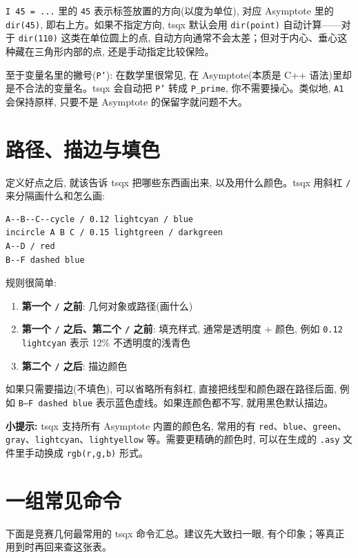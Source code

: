 \documentclass[11pt,oneside]{ctexbook}
\begin{document}
\texttt{I 45 = ...} 里的 \texttt{45} 表示标签放置的方向(以度为单位), 对应 Asymptote 里的 \texttt{dir(45)}, 即右上方。如果不指定方向, tsqx 默认会用 \texttt{dir(point)} 自动计算——对于 \texttt{dir(110)} 这类在单位圆上的点, 自动方向通常不会太差；但对于内心、垂心这种藏在三角形内部的点, 还是手动指定比较保险。

至于变量名里的撇号(\texttt{P'}): 在数学里很常见, 在 Asymptote(本质是 C++ 语法)里却是不合法的变量名。tsqx 会自动把 \texttt{P'} 转成 \texttt{P\_prime}, 你不需要操心。类似地, \texttt{A1} 会保持原样, 只要不是 Asymptote 的保留字就问题不大。

\section{路径、描边与填色}
定义好点之后, 就该告诉 tsqx 把哪些东西画出来, 以及用什么颜色。tsqx 用斜杠 \texttt{/} 来分隔画什么和怎么画:
\begin{lstlisting}[language={}]
A--B--C--cycle / 0.12 lightcyan / blue
incircle A B C / 0.15 lightgreen / darkgreen
A--D / red
B--F dashed blue
\end{lstlisting}

规则很简单:
\begin{enumerate}
	\item \textbf{第一个 \texttt{/} 之前}: 几何对象或路径(画什么)
	\item \textbf{第一个 \texttt{/} 之后、第二个 \texttt{/} 之前}: 填充样式, 通常是透明度 + 颜色, 例如 \texttt{0.12 lightcyan} 表示 12\% 不透明度的浅青色
	\item \textbf{第二个 \texttt{/} 之后}: 描边颜色
\end{enumerate}

如果只需要描边(不填色), 可以省略所有斜杠, 直接把线型和颜色跟在路径后面, 例如 \texttt{B--F dashed blue} 表示蓝色虚线。如果连颜色都不写, 就用黑色默认描边。

\textbf{小提示: }tsqx 支持所有 Asymptote 内置的颜色名, 常用的有 \texttt{red}、\texttt{blue}、\texttt{green}、\texttt{gray}、\texttt{lightcyan}、\texttt{lightyellow} 等。需要更精确的颜色时, 可以在生成的 \texttt{.asy} 文件里手动换成 \texttt{rgb(r,g,b)} 形式。

\section{一组常见命令}
下面是竞赛几何最常用的 tsqx 命令汇总。建议先大致扫一眼, 有个印象；等真正用到时再回来查这张表。

\vspace{0.5cm}
\end{document}
